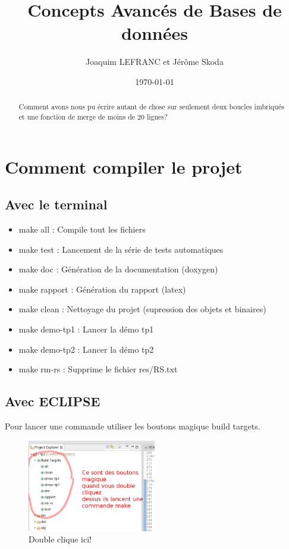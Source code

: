 \documentclass[a4paper]{article}
\title{Concepts Avancés de Bases de données}
\author{Joaquim LEFRANC et Jérôme Skoda}
\date{\today}
\begin{document}
\maketitle

\begin{abstract}
Comment avons nous pu écrire autant de chose sur seulement deux boucles imbriqués et une fonction de merge de moins de 20 lignes?
\end{abstract}

\section{Comment compiler le projet}

\subsection{Avec le terminal}

\begin{itemize}
	\item make all : Compile tout les fichiers
	\item make test : Lancement de la série de tests automatiques
	\item make doc  : Génération de la documentation (doxygen)
	\item make rapport : Génération du rapport (latex)
	\item make clean : Nettoyage du projet (supression des objets et binaires)
	\item make demo-tp1 : Lancer la démo tp1
	\item make demo-tp2 : Lancer la démo tp2
	\item make rm-rs : Supprime le fichier res/RS.txt
\end{itemize}

\subsection{Avec ECLIPSE}

Pour lancer une commande utiliser les boutons magique build targets.

\begin{figure}[h!] 
\centering
\includegraphics[width=0.5\textwidth]{bouton-magique.png}
\caption{Double clique ici!}
\end{figure}
\end{document}
